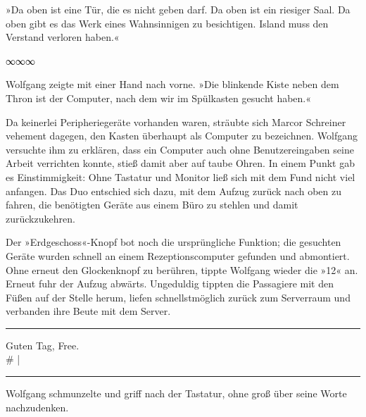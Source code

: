 »Da oben ist eine Tür, die es nicht geben darf. Da oben ist ein riesiger Saal. Da oben gibt es das Werk eines Wahnsinnigen zu besichtigen. Island muss den Verstand verloren haben.«

\begin{center}
∞∞∞
\end{center}

Wolfgang zeigte mit einer Hand nach vorne. »Die blinkende Kiste neben dem Thron ist der Computer, nach dem wir im Spülkasten gesucht haben.«

Da keinerlei Peripheriegeräte vorhanden waren, sträubte sich Marcor Schreiner vehement dagegen, den Kasten überhaupt als Computer zu bezeichnen. Wolfgang versuchte ihm zu erklären, dass ein Computer auch ohne Benutzereingaben seine Arbeit verrichten konnte, stieß damit aber auf taube Ohren. In einem Punkt gab es Einstimmigkeit: Ohne Tastatur und Monitor ließ sich mit dem Fund nicht viel anfangen. Das Duo entschied sich dazu, mit dem Aufzug zurück nach oben zu fahren, die benötigten Geräte aus einem Büro zu stehlen und damit zurückzukehren.

Der »Erdgeschoss«-Knopf bot noch die ursprüngliche Funktion; die gesuchten Geräte wurden schnell an einem Rezeptionscomputer gefunden und abmontiert. Ohne erneut den Glockenknopf zu berühren, tippte Wolfgang wieder die »12« an. Erneut fuhr der Aufzug abwärts. Ungeduldig tippten die Passagiere mit den Füßen auf der Stelle herum, liefen schnellstmöglich zurück zum Serverraum und verbanden ihre Beute mit dem Server.

\noindent \parbox{\textwidth}{ \vspace{3ex} \hrule \vspace{3ex}

    \begin{footnotesize}
    \begin{ttfamily}

\noindent Guten Tag, Free.\\
\noindent \# |

    \end{ttfamily}
    \end{footnotesize}

\vspace{3ex} \hrule \vspace{3ex} }

Wolfgang schmunzelte und griff nach der Tastatur, ohne groß über seine Worte nachzudenken.

